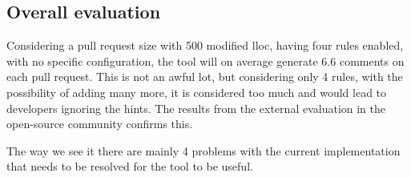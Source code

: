 \documentclass{report}
\begin{document}
\subsection{Overall evaluation}
\label{evaluation-overall}

Considering a pull request size with 500 modified \gls{lloc}, having four rules enabled, with no specific configuration, the tool will on average generate 6.6 comments on each pull request. This is not an awful lot, but considering only 4 rules, with the possibility of adding many more, it is considered too much and would lead to developers ignoring the hints. The results from the external evaluation in the open-source community confirms this.

The way we see it there are mainly 4 problems with the current implementation that needs to be resolved for the tool to be useful. 
\end{document}
